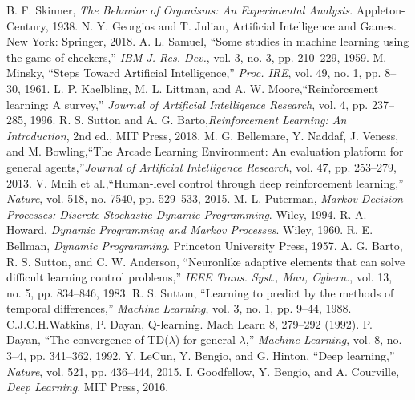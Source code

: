\documentclass[conference]{IEEEtran}
\begin{document}
\begin{thebibliography}{00}

     B. F. Skinner, \textit{The Behavior of Organisms: An Experimental Analysis}. Appleton-Century, 1938.
     N. Y. Georgios and T. Julian, Artificial Intelligence and Games. New York: Springer, 2018.
     A. L. Samuel, “Some studies in machine learning using the game of checkers,” \textit{IBM J. Res. Dev.}, vol. 3, no. 3, pp. 210–229, 1959.
     M. Minsky, “Steps Toward Artificial Intelligence,” \textit{Proc. IRE}, vol. 49, no. 1, pp. 8–30, 1961.
     L. P. Kaelbling, M. L. Littman, and A. W. Moore,“Reinforcement learning: A survey,” \textit{Journal of Artificial Intelligence Research}, vol. 4, pp. 237–285, 1996.
     R. S. Sutton and A. G. Barto,\textit{Reinforcement Learning: An Introduction}, 2nd ed., MIT Press, 2018.
     M. G. Bellemare, Y. Naddaf, J. Veness, and M. Bowling,“The Arcade Learning Environment: An evaluation platform for general agents,”\textit{Journal of Artificial Intelligence Research}, vol. 47, pp. 253–279, 2013.
     V. Mnih et al.,“Human-level control through deep reinforcement learning,” \textit{Nature}, vol. 518, no. 7540, pp. 529–533, 2015.
     M. L. Puterman, \textit{Markov Decision Processes: Discrete Stochastic Dynamic Programming}. Wiley, 1994.
     R. A. Howard, \textit{Dynamic Programming and Markov Processes}. Wiley, 1960.
     R. E. Bellman, \textit{Dynamic Programming}. Princeton University Press, 1957.
     A. G. Barto, R. S. Sutton, and C. W. Anderson, “Neuronlike adaptive elements that can solve difficult learning control problems,” \textit{IEEE Trans. Syst., Man, Cybern.}, vol. 13, no. 5, pp. 834–846, 1983.
     R. S. Sutton, “Learning to predict by the methods of temporal differences,” \textit{Machine Learning}, vol. 3, no. 1, pp. 9–44, 1988.
     C.J.C.H.Watkins, P. Dayan, Q-learning. Mach Learn 8, 279–292 (1992).
     P. Dayan, “The convergence of TD($\lambda$) for general $\lambda$,” \textit{Machine Learning}, vol. 8, no. 3–4, pp. 341–362, 1992.
     Y. LeCun, Y. Bengio, and G. Hinton, “Deep learning,” \textit{Nature}, vol. 521, pp. 436–444, 2015.
     I. Goodfellow, Y. Bengio, and A. Courville, \textit{Deep Learning}. MIT Press, 2016.

\end{thebibliography}
\end{document}
